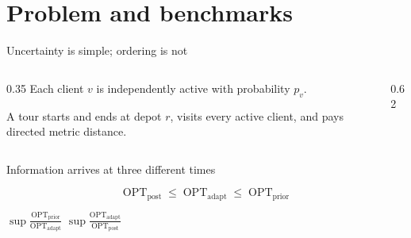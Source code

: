 \documentclass[aspectratio=169,12pt]{beamer}
\newcommand{\OPT}{\mathrm{OPT}}
\newcommand{\optpost}{\OPT_{\mathrm{post}}}
\newcommand{\optadapt}{\OPT_{\mathrm{adapt}}}
\newcommand{\optprior}{\OPT_{\mathrm{prior}}}
\newcommand{\1}{\mathbf{1}}
\begin{document}
\section{Problem and benchmarks}

\begin{frame}{Uncertainty is simple; ordering is not}
  \begin{columns}[T,onlytextwidth]
    \begin{column}{0.35\textwidth}
      \vspace{0.00cm}
      Each client \(v\) is independently active with probability \(p_v\).

      \vspace{0.24cm}
      A tour starts and ends at depot \(r\), visits every active client, and
      pays directed metric distance.

      \vspace{0.22cm}
      {\small
      }
    \end{column}
    \begin{column}{0.62\textwidth}
      \centering
      \resizebox{0.99\linewidth}{!}{\StMasterOrder}
    \end{column}
  \end{columns}
  \vspace{-0.02cm}
\end{frame}

\begin{frame}{Information arrives at three different times}
  \centering
  \resizebox{0.74\linewidth}{!}{\StBenchmarkLadder}

  \vspace{0.02cm}
  \[
    \optpost \;\le\; \optadapt \;\le\; \optprior
  \]

  \vspace{-0.30cm}
  \small
  \(\displaystyle\sup\frac{\optprior}{\optadapt}\)
  \hspace{0.75cm}
  \(\displaystyle\sup\frac{\optadapt}{\optpost}\)
\end{frame}
\end{document}
